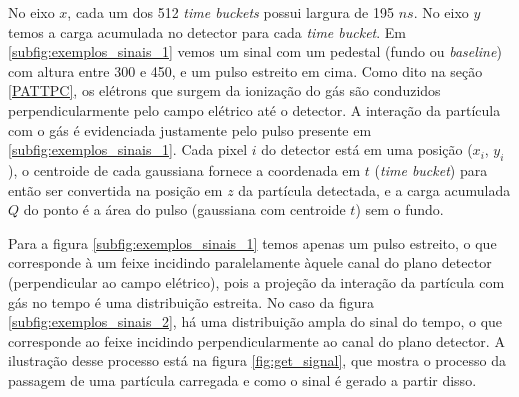\documentclass[a4paper,12pt,oneside]{book}
\begin{document}
\par No eixo $x$, cada um dos 512 \textit{time buckets} possui largura de 195 $n s$. No eixo $y$ temos a carga acumulada no detector para cada \textit{time bucket}. Em \ref{subfig:exemplos_sinais_1} vemos um sinal com um pedestal (fundo ou \textit{baseline}) com altura entre 300 e 450, e um pulso estreito em cima. Como dito na seção \ref{PATTPC}, os elétrons que surgem da ionização do gás são conduzidos perpendicularmente pelo campo elétrico até o detector. A interação da partícula com o gás é evidenciada justamente pelo pulso presente em \ref{subfig:exemplos_sinais_1}. Cada pixel $i$ do detector está em uma posição ($x_i$, $y_i$), o centroide de cada gaussiana fornece a coordenada em $t$ (\textit{time bucket}) para então ser convertida na posição em $z$ da partícula detectada, e a carga acumulada $Q$ do ponto é a área do pulso (gaussiana com centroide $t$) sem o fundo.

\par Para a figura \ref{subfig:exemplos_sinais_1} temos apenas um pulso estreito, o que corresponde à um feixe incidindo paralelamente àquele canal do plano detector (perpendicular ao campo elétrico), pois a projeção da interação da partícula com gás no tempo é uma distribuição estreita. No caso da figura \ref{subfig:exemplos_sinais_2}, há uma distribuição ampla do sinal do tempo, o que corresponde ao feixe incidindo perpendicularmente ao canal do plano detector. A ilustração desse processo está na figura \ref{fig:get_signal}, que mostra o processo da passagem de uma partícula carregada e como o sinal é gerado a partir disso.



\end{document}
